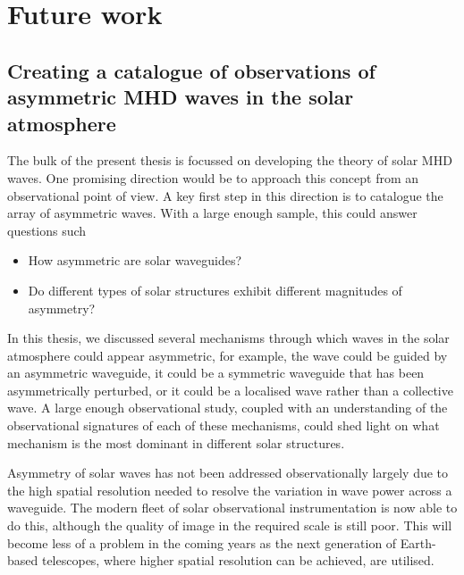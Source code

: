 \documentclass[12pt]{../style-files/ociamthesis}
\begin{document}
\baselineskip=18pt

\setcounter{secnumdepth}{3}
\setcounter{tocdepth}{3}

\setcounter{chapter}{6}


\chapter{Future work}
\label{chap: future work}


\section{Creating a catalogue of observations of asymmetric MHD waves in the solar atmosphere}
The bulk of the present thesis is focussed on developing the theory of solar MHD waves. One promising direction would be to approach this concept from an observational point of view. A key first step in this direction is to catalogue the array of asymmetric waves. With a large enough sample, this could answer questions such
\begin{itemize}
	\item How asymmetric are solar waveguides?
	\item Do different types of solar structures exhibit different magnitudes of asymmetry?
\end{itemize}

In this thesis, we discussed several mechanisms through which waves in the solar atmosphere could appear asymmetric, for example, the wave could  be guided by an asymmetric waveguide, it could be a symmetric waveguide that has been asymmetrically perturbed, or it could be a localised wave rather than a collective wave. A large enough observational study, coupled with an understanding of the observational signatures of each of these mechanisms, could shed light on what mechanism is the most dominant in different solar structures.

Asymmetry of solar waves has not been addressed observationally largely due to the high spatial resolution needed to resolve the variation in wave power across a waveguide. The modern fleet of solar observational instrumentation is now able to do this, although the quality of image in the required scale is still poor. This will become less of a problem in the coming years as the next generation of Earth-based telescopes, where higher spatial resolution can be achieved,  are utilised.
\end{document}
